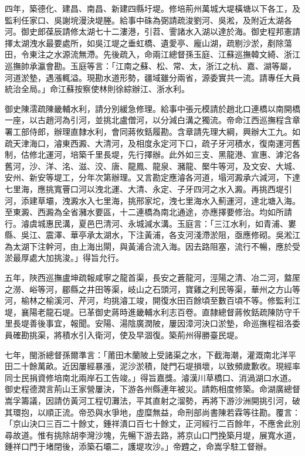 \begin{pinyinscope}
四年，築德化、建昌、南昌、新建四縣圩堤。修培荊州萬城大堤橫塘以下各工，及監利任家口、吳謝垸漫決堤塍。給事中硃為弼請疏浚劉河、吳淞，及附近太湖各河。御史郎葆辰請修太湖七十二漊港，引苕、霅諸水入湖以達於海。御史程邦憲請擇太湖洩水最要處所，如吳江堤之垂虹橋、遺愛亭、龐山湖，疏剔沙淤，剷除蕩田，令東注之水源流無滯。先後疏入，命兩江總督孫玉庭、江蘇巡撫韓文綺、浙江巡撫帥承瀛會勘。玉庭等言：「江南之蘇、松、常、太，浙江之杭、嘉、湖等屬，河道淤墊，遇漲輒溢。現勘水道形勢，疆域雖分兩省，源委實共一流。請專任大員統治全局。」命江蘇按察使林則徐綜辦江、浙水利。

御史陳澐疏陳畿輔水利，請分別緩急修理。給事中張元模請於趙北口連橋以南開橋一座，以古趙河為引河，並挑北盧僧河，以分減白溝之獨流。帝命江西巡撫程含章署工部侍郎，辦理直隸水利，會同蔣攸銛履勘。含章請先理大綱，興辦大工九。如疏天津海口，濬東西澱、大清河，及相度永定河下口，疏子牙河積水，復南運河舊制，估修北運河，培築千里長堤，先行擇辦。此外如三支、黑龍港、宣惠、滹沱各舊河，沙、洋、洺、滋、洨、唐、龍鳳、龍泉、瀦龍、檿牛等河，及文安、大城、安州、新安等堤工，分年次第辦理。又言勘定應濬各河道，塌河澱承六減河，下達七里海，應挑寬罾口河以洩北運、大清、永定、子牙四河之水入澱。再挑西堤引河，添建草壩，洩澱水入七里海，挑邢家坨，洩七里海水入薊運河，達北塘入海。至東澱、西澱為全省瀦水要區，十二連橋為南北通途，亦應擇要修治。均如所請行。濬虞城惠民溝，夏邑巴清河、永城減水溝。玉庭言：「三江水利，如青浦、婁縣、吳江、震澤、華亭承太湖水，下注黃浦，各支河淺滯淤阻，亟應修砌。吳淞江為太湖下注幹河，由上海出閘，與黃浦合流入海。因去路阻塞，流行不暢，應於受淤最厚處大加挑浚。」得旨允行。

五年，陜西巡撫盧坤疏報咸寧之龍首渠，長安之蒼龍河，涇陽之清、冶二河，盩厔之澇、峪等河，郿縣之井田等渠，岐山之石頭河，寶雞之利民等渠，華州之方山等河，榆林之榆溪河、芹河，均挑濬工竣，開復水田百餘頃至數百頃不等。修監利江堤，襄陽老龍石堤。已革御史蔣時進畿輔水利志百卷。直隸總督蔣攸銛疏陳防守千里長堤善後事宜，報聞。安陽、湯陰廣潤陂，屢因漳河決口淤墊，命巡撫程祖洛委員確勘挑渠，將積水引入衛河，使及早涸復。築荊州得勝臺民堤。

七年，閩浙總督孫爾準言：「莆田木蘭陂上受諸渠之水，下截海潮，灌溉南北洋平田二十餘萬畝。近因屢經暴漲，泥沙淤積，陡門石堤損壞，以致頻歲歉收。現經率同士民捐資修培南北兩岸石工告竣。」得旨嘉獎。濬漢川草橋口、消渦湖口水道。御史程德潤言荊山王家營屢決，下游各州縣連年被災。請飭相度修築。命湖廣總督嵩孚籌議，因請仿黃河工程切灘法，平其直射之溜勢，再將下游沙洲開挑引河，破其環抱，以順正流。帝恐與水爭地，虛糜無益，命刑部尚書陳若霖等往勘。覆言：「京山決口三百二十餘丈，鍾祥潰口百七十餘丈，正河經行二百餘年，不應舍此別尋故道。惟有挑除胡李灣沙塊，先暢下游去路，將京山口門挽築月堤，展寬水道，鍾祥口門于堵閉後，添築石壩二，護堤攻沙。」帝韙之，命嵩孚駐工督辦。


\end{pinyinscope}
